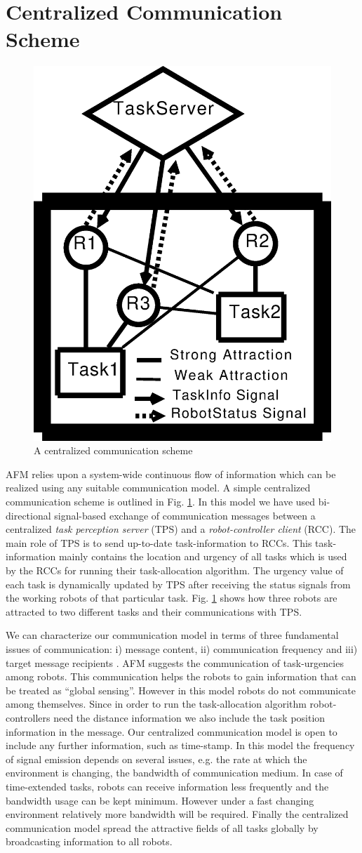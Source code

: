 \documentclass[smallcondensed]{svjour3}
\begin{document}
\section{Centralized Communication Scheme}
\label{sec:comm}
\begin{figure}
\centering
\includegraphics[height=0.5\textwidth, angle=0]{./images/CentralizedComm.eps}
\caption{\small A centralized communication scheme} %
\label{fig:ccm} %
\end{figure}
AFM relies upon a system-wide continuous flow of information which can be realized using any suitable communication model. A simple centralized communication scheme is outlined in Fig. \ref{fig:ccm}. In this model we have used bi-directional signal-based exchange of communication messages between a centralized \textit{task perception server} (TPS) and a \textit{robot-controller client} (RCC). The main role of TPS is to send up-to-date task-information to RCCs. This  task-information mainly contains the location and urgency of all tasks  which is used by the RCCs for running their task-allocation algorithm. The urgency value of each task is dynamically updated  by TPS after receiving the  status signals from the working robots of that particular task. Fig. \ref{fig:ccm} shows how three robots are attracted to two different tasks and their communications with TPS.

We can characterize our communication model in terms of three fundamental issues of communication: 
i) message content, ii) communication frequency and iii) target message recipients \citep{Gerkey+2001}.
AFM suggests the communication of task-urgencies  among robots. This communication helps the robots to gain information that can be  treated as ``global sensing''. However in this model  robots do not communicate among themselves. Since in order to run the task-allocation algorithm robot-controllers need the distance information we also include the task position information in  the message. Our centralized communication model is open to include any further information, such as time-stamp. In this model the frequency of signal emission depends on several issues, e.g. the rate at which the environment is changing, the bandwidth of communication medium. In case of time-extended tasks, robots can receive information less frequently and the  bandwidth usage can be kept  minimum. However under a fast changing environment relatively more bandwidth will be required.  Finally the centralized communication model spread the attractive fields of all tasks globally by broadcasting information to all robots.  
\end{document}
